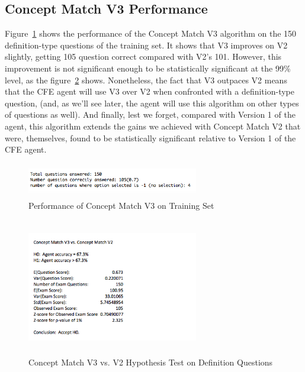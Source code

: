 \subsection{Concept Match V3 Performance}

Figure~\ref{fig:concept_match_v3_training_set_performance} shows the performance of the Concept Match V3 algorithm on the 150 definition-type questions of the training set.  It shows that V3 improves on V2 slightly, getting 105 question correct compared with V2's 101.  However, this improvement is not significant enough to be statistically significant at the 99\% level, as the figure~\ref{fig:concept_match_v3_hypothesis_test} shows.  Nonetheless, the fact that V3 outpaces V2 means that the CFE agent will use V3 over V2 when confronted with a definition-type question, (and, as we'll see later, the agent will use this algorithm on other types of questions as well).  And finally, lest we forget, compared with Version 1 of the agent, this algorithm extends the gains we achieved with Concept Match V2 that were, themselves, found to be statistically significant relative to Version 1 of the CFE agent.

\begin{figure}
\centering
\vspace{0.75in}
\includegraphics[width=75mm, height=15mm]{concept_match_v3_training_set_performance.png}
\caption{Performance of Concept Match V3 on Training Set}
\label{fig:concept_match_v3_training_set_performance}
\end{figure}



\begin{figure}
\centering
\vspace{0.75in}
\includegraphics[width=75mm, height=60mm]{concept_match_v3_hypothesis_test.png}
\caption{Concept Match V3 vs. V2 Hypothesis Test on Definition Questions}
\label{fig:concept_match_v3_hypothesis_test}
\end{figure}



